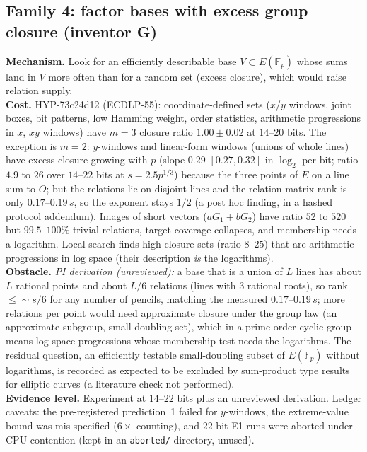 \documentclass[11pt,a4paper]{article}
\theoremstyle{remark}
\newcommand{\F}{\mathbb{F}}
\begin{document}
\subsection{Family 4: factor bases with excess group closure (inventor G)}
\textbf{Mechanism.} Look for an efficiently describable base $V\subset E(\F_p)$ whose sums land in $V$ more often than for a random set (excess closure), which would raise relation supply.\\
\textbf{Cost.} \mbox{HYP-73c24d12} (ECDLP-55): coordinate-defined sets ($x$/$y$ windows, joint boxes, bit patterns, low Hamming weight, order statistics, arithmetic progressions in $x$, $xy$ windows) have $m=3$ closure ratio $1.00\pm0.02$ at $14$--$20$ bits. The exception is $m=2$: $y$-windows and linear-form windows (unions of whole lines) have excess closure growing with $p$ (slope $0.29$ $[0.27,0.32]$ in $\log_2$ per bit; ratio $4.9$ to $26$ over $14$--$22$ bits at $s=2.5p^{1/3}$) because the three points of $E$ on a line sum to $O$; but the relations lie on disjoint lines and the relation-matrix rank is only $0.17$--$0.19\,s$, so the exponent stays $1/2$ (a post hoc finding, in a hashed protocol addendum). Images of short vectors ($aG_1+bG_2$) have ratio $52$ to $520$ but $99.5$--$100\%$ trivial relations, target coverage collapses, and membership needs a logarithm. Local search finds high-closure sets (ratio $8$--$25$) that are arithmetic progressions in log space (their description \emph{is} the logarithms).\\
\textbf{Obstacle.} \emph{PI derivation (unreviewed):} a base that is a union of $L$ lines has about $L$ rational points and about $L/6$ relations (lines with $3$ rational roots), so rank $\le\sim s/6$ for any number of pencils, matching the measured $0.17$--$0.19\,s$; more relations per point would need approximate closure under the group law (an approximate subgroup, small-doubling set), which in a prime-order cyclic group means log-space progressions whose membership test needs the logarithms. The residual question, an efficiently testable small-doubling subset of $E(\F_p)$ without logarithms, is recorded as expected to be excluded by sum-product type results for elliptic curves (a literature check not performed).\\
\textbf{Evidence level.} Experiment at $14$--$22$ bits plus an unreviewed derivation. Ledger caveats: the pre-registered prediction~1 failed for $y$-windows, the extreme-value bound was mis-specified ($6\times$ counting), and $22$-bit E1 runs were aborted under CPU contention (kept in an \texttt{aborted/} directory, unused).
\end{document}
